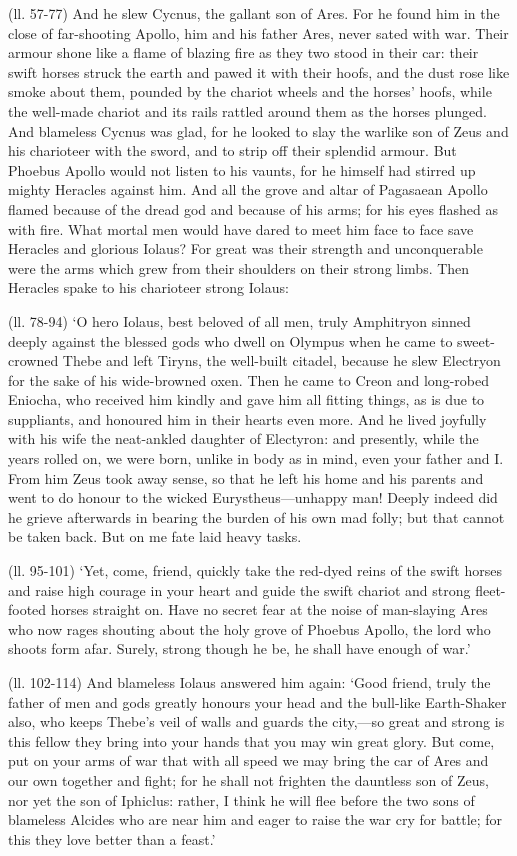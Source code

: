 (ll. 57-77) And he slew Cycnus, the gallant son of Ares. For he found him in
the close of far-shooting Apollo, him and his father Ares, never sated with
war. Their armour shone like a flame of blazing fire as they two stood in their
car: their swift horses struck the earth and pawed it with their hoofs, and the
dust rose like smoke about them, pounded by the chariot wheels and the
horses’ hoofs, while the well-made chariot and its rails rattled around
them as the horses plunged. And blameless Cycnus was glad, for he looked to
slay the warlike son of Zeus and his charioteer with the sword, and to strip
off their splendid armour. But Phoebus Apollo would not listen to his vaunts,
for he himself had stirred up mighty Heracles against him. And all the grove
and altar of Pagasaean Apollo flamed because of the dread god and because of
his arms; for his eyes flashed as with fire. What mortal men would have dared
to meet him face to face save Heracles and glorious Iolaus? For great was their
strength and unconquerable were the arms which grew from their shoulders on
their strong limbs. Then Heracles spake to his charioteer strong Iolaus:

(ll. 78-94) ‘O hero Iolaus, best beloved of all men, truly Amphitryon
sinned deeply against the blessed gods who dwell on Olympus when he came to
sweet-crowned Thebe and left Tiryns, the well-built citadel, because he slew
Electryon for the sake of his wide-browned oxen. Then he came to Creon and
long-robed Eniocha, who received him kindly and gave him all fitting things, as
is due to suppliants, and honoured him in their hearts even more. And he lived
joyfully with his wife the neat-ankled daughter of Electyron: and presently,
while the years rolled on, we were born, unlike in body as in mind, even your
father and I. From him Zeus took away sense, so that he left his home and his
parents and went to do honour to the wicked Eurystheus—unhappy man!
Deeply indeed did he grieve afterwards in bearing the burden of his own mad
folly; but that cannot be taken back. But on me fate laid heavy tasks.

(ll. 95-101) ‘Yet, come, friend, quickly take the red-dyed reins of the
swift horses and raise high courage in your heart and guide the swift chariot
and strong fleet-footed horses straight on. Have no secret fear at the noise of
man-slaying Ares who now rages shouting about the holy grove of Phoebus Apollo,
the lord who shoots form afar. Surely, strong though he be, he shall have
enough of war.’

(ll. 102-114) And blameless Iolaus answered him again: ‘Good friend,
truly the father of men and gods greatly honours your head and the bull-like
Earth-Shaker also, who keeps Thebe’s veil of walls and guards the
city,—so great and strong is this fellow they bring into your hands that
you may win great glory. But come, put on your arms of war that with all speed
we may bring the car of Ares and our own together and fight; for he shall not
frighten the dauntless son of Zeus, nor yet the son of Iphiclus: rather, I
think he will flee before the two sons of blameless Alcides who are near him
and eager to raise the war cry for battle; for this they love better than a
feast.’

